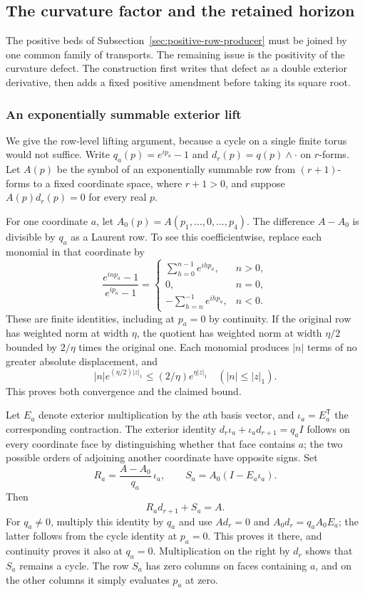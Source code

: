\subsection{The curvature factor and the retained horizon}
\label{sec:curvature-horizon-producer}
The positive beds of Subsection~\ref{sec:positive-row-producer} must
be joined by one common family of transports. The remaining issue
is the positivity of the curvature defect. The construction first
writes that defect as a double exterior derivative, then adds a
fixed positive amendment before taking its square root.

\subsubsection{An exponentially summable exterior lift}
We give the row-level lifting argument, because a cycle on a
single finite torus would not suffice. Write
$q_a(p)=e^{ip_a}-1$ and $d_r(p)=q(p)\wedge\cdot$ on $r$-forms.
Let $A(p)$ be the symbol of an exponentially summable row from
$(r+1)$-forms to a fixed coordinate space, where $r+1>0$, and
suppose $A(p)d_r(p)=0$ for every real $p$.

For one coordinate $a$, let $A_0(p)=A(p_1,\ldots,0,\ldots,p_4)$.
The difference $A-A_0$ is divisible by $q_a$ as a Laurent row.
To see this coefficientwise, replace each monomial in that
coordinate by
\[
 \frac{e^{inp_a}-1}{e^{ip_a}-1}
 =\begin{cases}
   \sum_{h=0}^{n-1}e^{ihp_a},& n>0,\\
   0,&n=0,\\
   -\sum_{h=n}^{-1}e^{ihp_a},&n<0.
  \end{cases}
\]
These are finite identities, including at $p_a=0$ by continuity.
If the original row has weighted norm at width $\eta$, the
quotient has weighted norm at width $\eta/2$ bounded by
$2/\eta$ times the original one. Each monomial produces $|n|$
terms of no greater absolute displacement, and
\[
       |n|e^{(\eta/2)|z|_1}
                  \le (2/\eta)e^{\eta|z|_1}
                   \quad(|n|\le|z|_1).
\]
This proves both convergence and the claimed bound.

Let $E_a$ denote exterior multiplication by the $a$th basis
vector, and $\iota_a=E_a^{\mathsf T}$ the corresponding
contraction. The exterior identity
$d_r\iota_a+\iota_a d_{r+1}=q_a I$ follows on every coordinate
face by distinguishing whether that face contains $a$; the two
possible orders of adjoining another coordinate have opposite
signs. Set
\[
       R_a=\frac{A-A_0}{q_a}\,\iota_a,
       \qquad S_a=A_0(I-E_a\iota_a).
\]
Then
\begin{equation}\label{eq:curvature-axis-lift}
                            R_a d_{r+1}+S_a=A.
\end{equation}
For $q_a\ne0$, multiply this identity by $q_a$ and use
$Ad_r=0$ and $A_0d_r=q_aA_0E_a$; the latter follows from
the cycle identity at $p_a=0$. This proves it there, and
continuity proves it also at $q_a=0$. Multiplication on the
right by $d_r$ shows that $S_a$ remains a cycle.
The row $S_a$ has zero columns on faces containing $a$, and
on the other columns it simply evaluates $p_a$ at zero.

